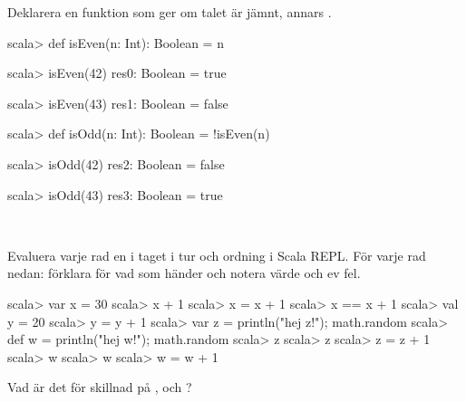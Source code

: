 \Subtask Deklarera en funktion  som ger  om talet  är jämnt, annars .

\SOLUTION


\TaskSolved \what

\SubtaskSolved
\begin{REPL}
scala> def isEven(n: Int): Boolean = n %

scala> isEven(42)
res0: Boolean = true

scala> isEven(43)
res1: Boolean = false

\end{REPL}


\SubtaskSolved
\begin{REPL}
scala> def isOdd(n: Int): Boolean = !isEven(n)

scala> isOdd(42)
res2: Boolean = false

scala> isOdd(43)
res3: Boolean = true
\end{REPL}


\QUESTEND






\QUESTBEGIN

\Task \what~

\Subtask
 Evaluera varje rad en i taget i tur och ordning i Scala REPL. För varje rad nedan: förklara för vad som händer och notera värde och ev fel. %
\begin{REPL}
scala> var x = 30
scala> x + 1
scala> x = x + 1
scala> x == x + 1
scala> val y = 20
scala> y = y + 1
scala> var z = { println("hej z!"); math.random }
scala> def w = { println("hej w!"); math.random }
scala> z
scala> z
scala> z = z + 1
scala> w
scala> w
scala> w = w + 1
\end{REPL}


\Subtask Vad är det för skillnad på ,  och ?



\SOLUTION

\TaskSolved \what

